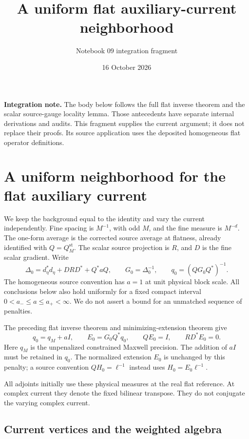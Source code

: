 \documentclass[11pt]{article}
\title{A uniform flat auxiliary-current neighborhood}
\author{Notebook 09 integration fragment}
\date{16 October 2026}
\theoremstyle{remark}
\begin{document}
\maketitle

\noindent\textbf{Integration note.}
The body below follows the full flat inverse theorem and the scalar
source-gauge locality lemma. Those antecedents have separate internal
derivations and audits. This fragment supplies the current argument;
it does not replace their proofs. Its source application uses the
deposited homogeneous flat operator definitions.

\section{A uniform neighborhood for the flat auxiliary current}
\label{current-section}

We keep the background equal to the identity and vary the current
independently. Fine spacing is $M^{-1}$, with odd $M$, and the fine
measure is $M^{-d}$. The one-form average is the corrected source
average at flatness, already identified with $Q=Q_M^{\mathrm{st}}$.
The scalar source projection is $R$, and $D$ is the fine scalar
gradient. Write
\[
 \Delta_0=d_\eta^*d_\eta+DRD^*+Q^*aQ,
 \qquad G_0=\Delta_0^{-1},
 \qquad q_0=(QG_0Q^*)^{-1}.
\]
The homogeneous source convention has $a=1$ at unit physical block
scale. All conclusions below also hold uniformly for a fixed compact
interval $0<a_-\le a\le a_+<\infty$. We do not assert a bound for an
unmatched sequence of penalties.

The preceding flat inverse theorem and minimizing-extension theorem give
\begin{equation}
 q_0=q_M+aI,
 \qquad E_0=G_0Q^*q_0,
 \qquad QE_0=I,
 \qquad RD^*E_0=0.
 \label{current-base-identities}
\end{equation}
Here $q_M$ is the unpenalized constrained Maxwell precision. The
addition of $aI$ must be retained in $q_0$. The normalized extension
$E_0$ is unchanged by this penalty; a source convention
$QH_0=\ell^{-1}$ instead uses $H_0=E_0\ell^{-1}$.

All adjoints initially use these physical measures at the real flat
reference. At complex current they denote the fixed bilinear
transpose. They do not conjugate the varying complex current.

\subsection{Current vertices and the weighted algebra}
\label{current-vertices-section}
\end{document}
